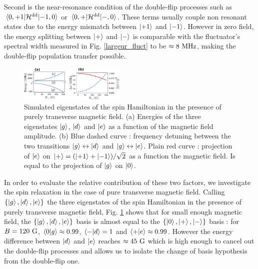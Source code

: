 \documentclass[preprintnumbers,amsmath,amssymb,superscriptaddress,twocolumn,showpacs]{revtex4-2}
\begin{document}
Second is the near-resonance condition of the double-flip processes such as $\mel{0,+1}{\mathcal{H}^{\rm dd}}{-1,0}$ or $\mel{0,+}{\mathcal{H}^{\rm dd}}{-,0}$. These terms usually couple non resonant states due to the energy mismatch between $\ket{+1}$ and $\ket{-1}$. However in zero field, the energy splitting between $\ket{+}$ and $\ket{-}$ is comparable with the fluctuator's spectral width measured in Fig. \ref{largeur_fluct} to be $\approx 8\ \rm MHz$, making the double-flip population transfer possible.

\begin{figure}
\includegraphics[width=0.45\textwidth]{Figures/fig transverse field simu}
\caption{Simulated eigenstates of the spin Hamiltonian in the presence of purely transverse magnetic field. (a) Energies of the three eigenstates $\ket{g}$, $\ket{d}$ and $\ket{e}$ as a function of the magnetic field amplitude. (b) Blue dashed curve : frequency detuning between the two transitions $\ket{g} \leftrightarrow \ket{d}$ and $\ket{g} \leftrightarrow \ket{e}$. Plain red curve : projection of $\ket{e}$ on $\ket{+}=(\ket{+1}+\ket{-1})/\sqrt{2}$ as a function the magnetic field. Is equal to the projection of $\ket{g}$ on $\ket{0}$.}
\label{calculs_B_transverse}
\end{figure}

In order to evaluate the relative contribution of these two factors, we investigate the spin relaxation in the case of pure transverse magnetic field. Calling $\{ \ket{g}, \ket{d}, \ket{e} \}$ the three eigenstates of the spin Hamiltonian in the presence of purely transverse magnetic field, Fig. \ref{calculs_B_transverse} shows that for small enough magnetic field, the $\{ \ket{g}, \ket{d}, \ket{e} \}$ basis is almost equal to the $\{ \ket{0},\ket{+},\ket{-} \} $ basis : for $B=120\ \rm G$, $\braket{0}{g}\approx 0.99$, $\braket{-}{d}=1$ and $\braket{+}{e}\approx 0.99$. However the energy difference between $\ket{d}$ and $\ket{e}$ reaches $\approx 45\ \rm G$ which is high enough to cancel out the double-flip processes and allows us to isolate the change of basis hypothesis from the double-flip one.
\end{document}

